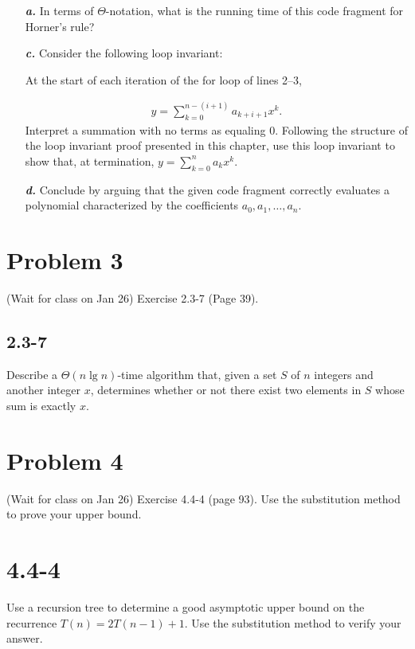 \documentclass{../../class}
\begin{document}
\begin{itemize}
    \item[\textbf{\textit{a.}}] In terms of $\Theta $-notation, what is the running time of this code fragment for Horner’s rule?
    \item[\textbf{\textit{c.}}] Consider the following loop invariant:
    \begin{adjustwidth}{2em}{0pt}
        At the start of each iteration of the for loop of lines 2–3,
    \end{adjustwidth}
    \begin{gather*}
        y = \sum_{k=0}^{n-(i+1)} a_{k+i+1}x^k.
    \end{gather*}
    Interpret a summation with no terms as equaling $0$. Following the structure of the loop invariant proof presented in this chapter, use this loop invariant to show that, at termination, $y = \sum_{k=0}^{n} a_kx^k$.
    \item[\textbf{\textit{d.}}] Conclude by arguing that the given code fragment correctly evaluates a polynomial characterized by the coefficients $a_0, a_1, \dots, a_n$.
\end{itemize}

\newpage
\section*{Problem 3}
\begin{tcolorbox}
    (Wait for class on Jan 26) Exercise 2.3-7 (Page 39).
\end{tcolorbox}

\subsection*{2.3-7}
Describe a $\Theta \left(n \lg{n}\right)$-time algorithm that, given a set $S$ of $n$ integers and another integer $x$, determines whether or not there exist two elements in $S$ whose sum is exactly $x$.

\newpage
\section*{Problem 4}
\begin{tcolorbox}
    (Wait for class on Jan 26) Exercise 4.4-4 (page 93). Use the substitution method to prove your upper bound.
\end{tcolorbox}

\section*{4.4-4}
Use a recursion tree to determine a good asymptotic upper bound on the recurrence $T(n) = 2T(n-1) + 1$. Use the substitution method to verify your answer.
\end{document}
